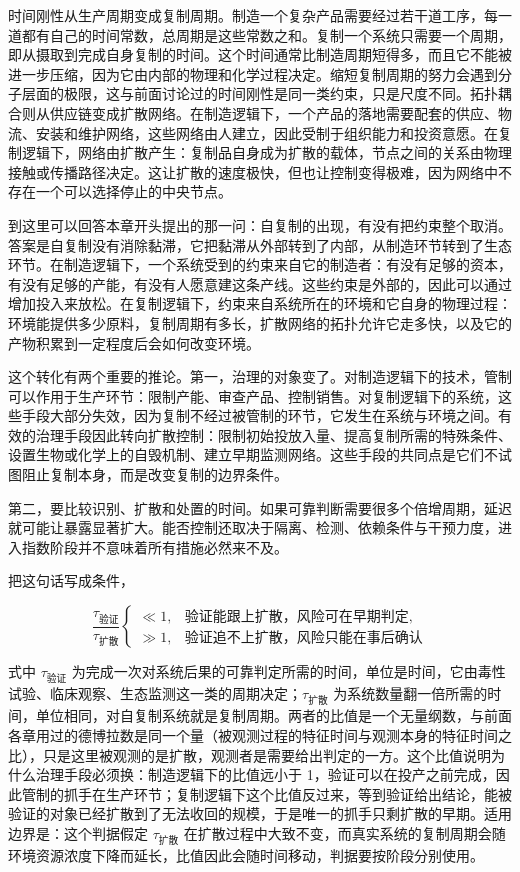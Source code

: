 时间刚性从生产周期变成复制周期。制造一个复杂产品需要经过若干道工序，每一道都有自己的时间常数，总周期是这些常数之和。复制一个系统只需要一个周期，即从摄取到完成自身复制的时间。这个时间通常比制造周期短得多，而且它不能被进一步压缩，因为它由内部的物理和化学过程决定。缩短复制周期的努力会遇到分子层面的极限，这与前面讨论过的时间刚性是同一类约束，只是尺度不同。拓扑耦合则从供应链变成扩散网络。在制造逻辑下，一个产品的落地需要配套的供应、物流、安装和维护网络，这些网络由人建立，因此受制于组织能力和投资意愿。在复制逻辑下，网络由扩散产生：复制品自身成为扩散的载体，节点之间的关系由物理接触或传播路径决定。这让扩散的速度极快，但也让控制变得极难，因为网络中不存在一个可以选择停止的中央节点。


到这里可以回答本章开头提出的那一问：自复制的出现，有没有把约束整个取消。答案是自复制没有消除黏滞，它把黏滞从外部转到了内部，从制造环节转到了生态环节。在制造逻辑下，一个系统受到的约束来自它的制造者：有没有足够的资本，有没有足够的产能，有没有人愿意建这条产线。这些约束是外部的，因此可以通过增加投入来放松。在复制逻辑下，约束来自系统所在的环境和它自身的物理过程：环境能提供多少原料，复制周期有多长，扩散网络的拓扑允许它走多快，以及它的产物积累到一定程度后会如何改变环境。

 这个转化有两个重要的推论。第一，治理的对象变了。对制造逻辑下的技术，管制可以作用于生产环节：限制产能、审查产品、控制销售。对复制逻辑下的系统，这些手段大部分失效，因为复制不经过被管制的环节，它发生在系统与环境之间。有效的治理手段因此转向扩散控制：限制初始投放入量、提高复制所需的特殊条件、设置生物或化学上的自毁机制、建立早期监测网络。这些手段的共同点是它们不试图阻止复制本身，而是改变复制的边界条件。

第二，要比较识别、扩散和处置的时间。如果可靠判断需要很多个倍增周期，延迟就可能让暴露显著扩大。能否控制还取决于隔离、检测、依赖条件与干预力度，进入指数阶段并不意味着所有措施必然来不及。

把这句话写成条件，

\begin{equation}
\frac{\tau_{\text{验证}}}{\tau_{\text{扩散}}}
\begin{cases}
\ll 1, & \text{验证能跟上扩散，风险可在早期判定},\\[2pt]
\gg 1, & \text{验证追不上扩散，风险只能在事后确认}
\end{cases}
\end{equation}

式中 $\tau_{\text{验证}}$ 为完成一次对系统后果的可靠判定所需的时间，单位是时间，它由毒性试验、临床观察、生态监测这一类的周期决定；$\tau_{\text{扩散}}$ 为系统数量翻一倍所需的时间，单位相同，对自复制系统就是复制周期。两者的比值是一个无量纲数，与前面各章用过的德博拉数是同一个量（被观测过程的特征时间与观测本身的特征时间之比），只是这里被观测的是扩散，观测者是需要给出判定的一方。这个比值说明为什么治理手段必须换：制造逻辑下的比值远小于 1，验证可以在投产之前完成，因此管制的抓手在生产环节；复制逻辑下这个比值反过来，等到验证给出结论，能被验证的对象已经扩散到了无法收回的规模，于是唯一的抓手只剩扩散的早期。适用边界是：这个判据假定 $\tau_{\text{扩散}}$ 在扩散过程中大致不变，而真实系统的复制周期会随环境资源浓度下降而延长，比值因此会随时间移动，判据要按阶段分别使用。

